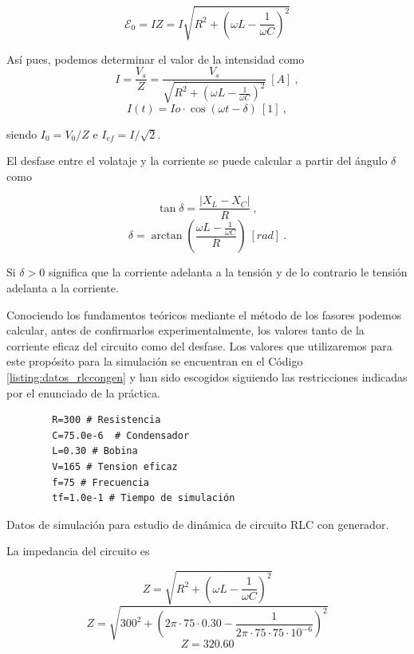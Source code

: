 \documentclass[journal]{IEEEtran}
\newenvironment{code}{\captionsetup{type=listing}}{\par\addvspace{\baselineskip}}
\begin{document}
\begin{equation}
\mathcal{E}_0 = IZ = I\sqrt{R^2 + (\omega L - \frac{1}{\omega C})^2}
\end{equation}

Así pues, podemos determinar el valor de la intensidad como
\begin{equation}
I = \frac{V_s}{Z} = \frac{V_s}{\sqrt{R^2 + (\omega L - \frac{1}{\omega C})^2}}~[A]~,
\end{equation}
\begin{equation}
I(t) = Io \cdot \cos{(\omega t - \delta)}~[1]~,
\end{equation}

siendo $I_0 = V_0 / Z$ e $I_{ef}=I/\sqrt{2}$.

El desfase entre el volataje y la corriente se puede calcular a partir del ángulo $\delta$ como

\begin{equation}
\tan{\delta} = \frac{|X_L - X_C|}{R}~,
\end{equation}
\begin{equation}
\delta = \arctan{(\frac{\omega L - \frac{1}{\omega C}}{R})}~[rad]~.
\end{equation}

Si $\delta > 0$ significa que la corriente adelanta a la tensión y de lo contrario le tensión adelanta a la corriente.

Conociendo los fundamentos teóricos mediante el método de los fasores podemos calcular, antes de confirmarlos experimentalmente, los valores tanto de la corriente eficaz del circuito como del desfase. Los valores que utilizaremos para este propósito para la simulación se encuentran en el Código \ref{listing:datos_rlccongen} y han sido escogidos siguiendo las restricciones indicadas por el enunciado de la práctica.

\begin{code}
    \begin{verbatim}
        R=300 # Resistencia
        C=75.0e-6  # Condensador
        L=0.30 # Bobina
        V=165 # Tension eficaz
        f=75 # Frecuencia
        tf=1.0e-1 # Tiempo de simulación
    \end{verbatim}
    \caption{Datos de simulación para estudio de dinámica de circuito RLC con generador.}
    \label{listing:datos_rlccongen}
\end{code}

La impedancia del circuito es

\begin{equation}
Z = \sqrt{R^2 + (\omega L - \frac{1}{\omega C})^2}
\end{equation}
\begin{equation}
Z=\sqrt{300^2 + (2\pi\cdot 75\cdot 0.30 - \frac{1}{2\pi\cdot 75\cdot 75\cdot 10^{-6}})^2}
\end{equation}
\begin{equation}
Z = 320.60
\end{equation}
\end{document}

